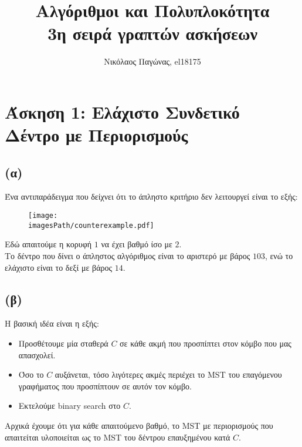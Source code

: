 

\newcommand{\imagesPath}{.}

\title{
	Αλγόριθμοι και Πολυπλοκότητα \\
	3η σειρά γραπτών ασκήσεων
}
\author{Νικόλαος Παγώνας, el18175}
\date{}



\maketitle

\section*{Άσκηση 1: Ελάχιστο Συνδετικό Δέντρο με Περιορισμούς}
	\subsection*{(α)}
		Ένα αντιπαράδειγμα που δείχνει ότι το άπληστο κριτήριο δεν λειτουργεί είναι το εξής:
		
		\begin{figure}[H]
			\texttt{[image: \\imagesPath/counterexample.pdf]}
		\end{figure}		
	
		Εδώ απαιτούμε η κορυφή $1$ να έχει βαθμό ίσο με $2$. \\
		
		Το δέντρο που δίνει ο άπληστος αλγόριθμος είναι το αριστερό με βάρος $103$, ενώ το ελάχιστο είναι το δεξί με βάρος $14$.
		
	\subsection*{(β)}
		Η βασική ιδέα είναι η εξής: \\
		
		\begin{itemize}
			\item Προσθέτουμε μία σταθερά $C$ σε κάθε ακμή που προσπίπτει στον κόμβο που μας απασχολεί.
			\item Όσο το $C$ αυξάνεται, τόσο λιγότερες ακμές περιέχει το MST του επαγόμενου γραφήματος που προσπίπτουν σε αυτόν τον κόμβο. 
			\item Εκτελούμε binary search στο $C$.
		\end{itemize}
	
		Αρχικά έχουμε ότι για κάθε απαιτούμενο βαθμό, το MST με περιορισμούς που απαιτείται υλοποιείται ως το MST του δέντρου επαυξημένου κατά $C$. \\
		
